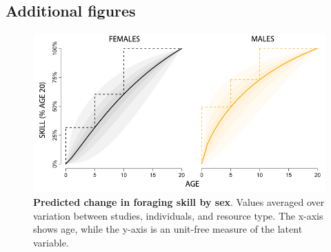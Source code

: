 \subsection{Additional figures}

\begin{figure}[h]
\centering
\includegraphics[width=12cm] {text/images/Figure_S2.pdf}
\renewcommand{\thefigure}{S\arabic{figure}}
\caption{\textbf{Predicted change in foraging skill by sex}. Values averaged over variation between studies, individuals, and resource type. The x-axis shows age, while the y-axis is an unit-free measure of the latent variable.}
\label{fig:sex_diffs}
\end{figure}


